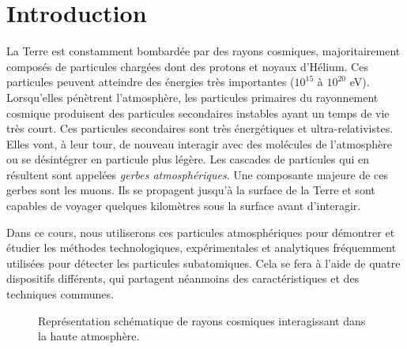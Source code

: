 \section{Introduction}

La Terre est constamment bombardée par des rayons cosmiques, majoritairement composés de particules chargées dont des protons et noyaux d'Hélium. Ces particules peuvent atteindre des énergies très importantes ($10^{15}$ à $10^{20}$ eV). Lorsqu'elles pénètrent l'atmosphère, les particules primaires du rayonnement cosmique produisent des particules secondaires instables ayant un temps de vie très court. Ces particules secondaires sont très énergétiques et ultra-relativistes. Elles vont, à leur tour, de nouveau interagir avec des molécules de l'atmosphère ou se désintégrer en particule plus légère. Les cascades de particules qui en résultent sont appelées \textit{gerbes atmosphériques}. Une composante majeure de ces gerbes sont les muons. Ils se propagent jusqu'à la surface de la Terre et sont capables de voyager quelques kilomètres sous la surface avant d'interagir.

Dans ce cours, nous utiliserons ces particules atmosphériques pour démontrer et étudier les méthodes technologiques, expérimentales et analytiques fréquemment utilisées pour détecter les particules subatomiques. Cela se fera à l'aide de quatre dispositifs différents, qui partagent néanmoins des caractéristiques et des techniques communes.

\begin{figure}[hb]
    \caption{\label{fig:CR} Représentation schématique de rayons cosmiques interagissant dans la haute atmosphère.}
\end{figure}

